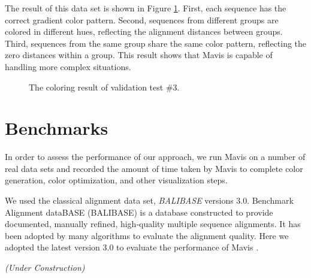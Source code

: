 The result of this data set is shown in Figure \ref{fig:test_3}. First, each sequence has the correct gradient color pattern. Second, sequences from different groups are colored in different hues, reflecting the alignment distances between groups. Third, sequences from the same group share the same color pattern, reflecting the zero distances within a group. This result shows that Mavis is capable of handling more complex situations.

\begin{figure}[htb]
\caption[Coloring Result of Validation Test \#3]{The coloring result of validation test \#3.}\label{fig:test_3}
\end{figure}

\section{Benchmarks}

In order to assess the performance of our approach, we run Mavis on a number of real data sets and recorded the amount of time taken by Mavis to complete color generation, color optimization, and other visualization steps.

We used the classical alignment data set, \emph{BALIBASE} versions 3.0. Benchmark Alignment dataBASE (BALIBASE) is a database constructed to provide documented, manually refined, high-quality multiple sequence alignments. It has been adopted by many algorithms to evaluate the alignment quality. Here we adopted the latest version 3.0 to evaluate the performance of Mavis \cite{Thompson:2005fk}.

\emph{(Under Construction)}